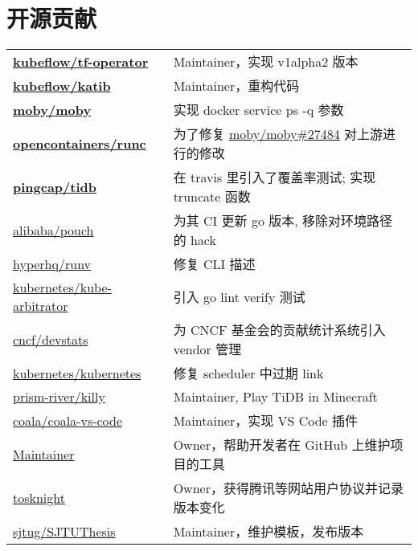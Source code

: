\documentclass[]{deedy-resume-openfont}
\begin{document}
\begin{minipage}[t]{0.68\textwidth}
\section{开源贡献}
\sectionsep
\begin{tabular}{ll}
\href{https://github.com/kubeflow/tf-operator/commits?author=gaocegege}{\bf kubeflow/tf-operator} & Maintainer，实现 v1alpha2 版本 \\
\href{https://github.com/kubeflow/katib/commits?author=gaocegege}{\bf kubeflow/katib} & Maintainer，重构代码 \\
\href{https://github.com/moby/moby/commits?author=gaocegege}{\bf moby/moby} & 实现 docker service ps -q 参数 \\
\href{https://github.com/opencontainers/runc/commits?author=gaocegege}{\bf opencontainers/runc} & 为了修复 \href{https://github.com/moby/moby/issues/27484}{moby/moby\#27484} 对上游进行的修改 \\
\href{https://github.com/pingcap/tidb/commits?author=gaocegege}{\bf pingcap/tidb} & 在 travis 里引入了覆盖率测试; 实现 truncate 函数 \\
\href{https://github.com/alibaba/pouch/commits?author=gaocegege}{alibaba/pouch} & 为其 CI 更新 go 版本, 移除对环境路径的 hack \\
\href{https://github.com/hyperhq/runv/commits?author=gaocegege}{hyperhq/runv} & 修复 CLI 描述 \\
\href{https://github.com/kubernetes-incubator/kube-arbitrator/commits?author=gaocegege}{kubernetes/kube-arbitrator} & 引入 go lint verify 测试\\
\href{https://github.com/cncf/devstats/commits?author=gaocegege}{cncf/devstats} & 为 CNCF 基金会的贡献统计系统引入 vendor 管理 \\
\href{https://github.com/kubernetes/kubernetes/commits?author=gaocegege}{kubernetes/kubernetes} & 修复 scheduler 中过期 link \\
\href{https://github.com/prism-river/killy}{prism-river/killy} & Maintainer, Play TiDB in Minecraft \\
\href{https://github.com/coala/coala-vs-code/commits/master?author=gaocegege}{coala/coala-vs-code} & Maintainer，实现 VS Code 插件 \\
\href{https://github.com/gaocegege/maintainer}{Maintainer} & Owner，帮助开发者在 GitHub 上维护项目的工具 \\
\href{https://github.com/siglt/tosknight}{tosknight} & Owner，获得腾讯等网站用户协议并记录版本变化 \\
\href{https://github.com/sjtug/SJTUThesis/commits?author=gaocegege}{sjtug/SJTUThesis} & Maintainer，维护模板，发布版本 \\

\end{tabular}
\end{minipage}
\end{document}
